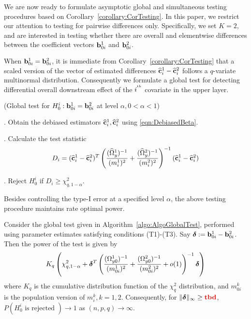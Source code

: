 We are now ready to formulate asymptotic global and simultaneous testing procedures based on Corollary~\ref{corollary:CorTesting}. In this paper, we restrict our attention to testing for pairwise differences only. Specifically, we set $K=2$, and are interested in testing whether there are overall and elementwise differences between the coefficient vectors ${\bf{b}}_{0i}^1$ and ${\bf{b}}_{0i}^2$.

When ${\bf{b}}_{0 i}^1 = {\bf{b}}_{0 i}^2$, it is immediate from Corollary~\ref{corollary:CorTesting} that a scaled version of the vector of estimated differences $\widehat {{\bf{c}}}_i^1 - \widehat {{\bf{c}}}_i^2$ follows a $q$-variate multinormal distribution. Consequently we formulate a global test for detecting differential overall downstream effect of the $i^{\operatorname*{^{\text{th}}}}$ covariate in the upper layer.

\begin{Algorithm}\label{algo:AlgoGlobalTest}
(Global test for $H_0^i: {\bf{b}}_{0 i}^1 = {\bf{b}}_{0 i}^2$ at level $\alpha, 0< \alpha< 1$)

. Obtain the debiased estimators $\widehat {{\bf{c}}}_i^1, \widehat {{\bf{c}}}_i^2$ using \eqref{eqn:DebiasedBeta}.

. Calculate the test statistic
%
$$
D_i = (\widehat {{\bf{c}}}_i^1 - \widehat {{\bf{c}}}_i^2)^T
\left( \frac{ (\widehat \Omega_y^1)^{-1}}{(m_i^1)^2} +
\frac{(\widehat \Omega_y^2)^{-1}}{(m_i^2)^2} \right)^{-1} (\widehat {{\bf{c}}}_i^1 - \widehat {{\bf{c}}}_i^2)
$$
%

. Reject $H_0^i$ if $D_i \geq \chi^2_{q, 1-\alpha}$.
\end{Algorithm}

Besides controlling the type-I error at a specified level $\alpha$, the above testing procedure maintains rate optimal power.

\begin{Theorem}
Consider the global test given in Algorithm~\ref{algo:AlgoGlobalTest}, performed using parameter estimates satisfying conditions (T1)-(T3). Say ${\boldsymbol{\delta}} := {\bf{b}}_{0 i}^1 - {\bf{b}}_{0 i}^2$. Then the power of the test is given by
%
$$
K_q \left( \chi^2_{q,1-\alpha} + {\boldsymbol{\delta}}^T 
\left( \frac{ (\Omega_{y 0}^1)^{-1}}{(m_{0 i}^1)^2} + \frac{(\Omega_{y 0}^2)^{-1}}{(m_{0 i}^2)^2}
+ o(1) \right)^{-1} {\boldsymbol{\delta}} \right)
$$
%
where $K_q$ is the cumulative distribution function of the $\chi^2_q$ distribution, and $m_{0 i}^k$ is the population version of $m_i^k, k=  1,2$. Consequently, for $\| {\boldsymbol{\delta}} \|_\infty \geq {\color{red} \bf tbd}$, $P( H_0^i \text{ is rejected }) \rightarrow 1$ as $(n,p,q) \rightarrow \infty$.
\end{Theorem}
%


